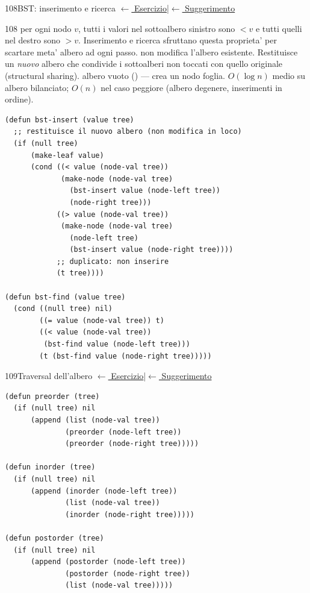\label{sol:108}
\begin{solbox}{108}{BST: inserimento e ricerca}
\small\color{black!55}\hyperref[ex:108]{$\leftarrow$ Esercizio}\enspace\textcolor{black!30}{|}\enspace\hyperref[hint:108]{$\leftarrow$ Suggerimento}\normalsize\color{black}
\begin{ragionamentoBox}{108}
 per ogni nodo $v$, tutti i valori nel sottoalbero
sinistro sono $< v$ e tutti quelli nel destro sono $> v$.
Inserimento e ricerca sfruttano questa proprieta' per scartare meta'
albero ad ogni passo.
  non modifica l'albero
esistente. Restituisce un \emph{nuovo} albero che condivide i sottoalberi
non toccati con quello originale (structural sharing).
 albero vuoto () — crea un nodo foglia.
 $O(\log n)$ medio su albero bilanciato;
$O(n)$ nel caso peggiore (albero degenere, inserimenti in ordine).
\end{ragionamentoBox}
\begin{lstlisting}
(defun bst-insert (value tree)
  ;; restituisce il nuovo albero (non modifica in loco)
  (if (null tree)
      (make-leaf value)
      (cond ((< value (node-val tree))
             (make-node (node-val tree)
               (bst-insert value (node-left tree))
               (node-right tree)))
            ((> value (node-val tree))
             (make-node (node-val tree)
               (node-left tree)
               (bst-insert value (node-right tree))))
            ;; duplicato: non inserire
            (t tree))))

(defun bst-find (value tree)
  (cond ((null tree) nil)
        ((= value (node-val tree)) t)
        ((< value (node-val tree))
         (bst-find value (node-left tree)))
        (t (bst-find value (node-right tree)))))
\end{lstlisting}
\end{solbox}

\label{sol:109}
\begin{solbox}{109}{Traversal dell'albero}
\small\color{black!55}\hyperref[ex:109]{$\leftarrow$ Esercizio}\enspace\textcolor{black!30}{|}\enspace\hyperref[hint:109]{$\leftarrow$ Suggerimento}\normalsize\color{black}
\begin{lstlisting}
(defun preorder (tree)
  (if (null tree) nil
      (append (list (node-val tree))
              (preorder (node-left tree))
              (preorder (node-right tree)))))

(defun inorder (tree)
  (if (null tree) nil
      (append (inorder (node-left tree))
              (list (node-val tree))
              (inorder (node-right tree)))))

(defun postorder (tree)
  (if (null tree) nil
      (append (postorder (node-left tree))
              (postorder (node-right tree))
              (list (node-val tree)))))
\end{lstlisting}
\end{solbox}

